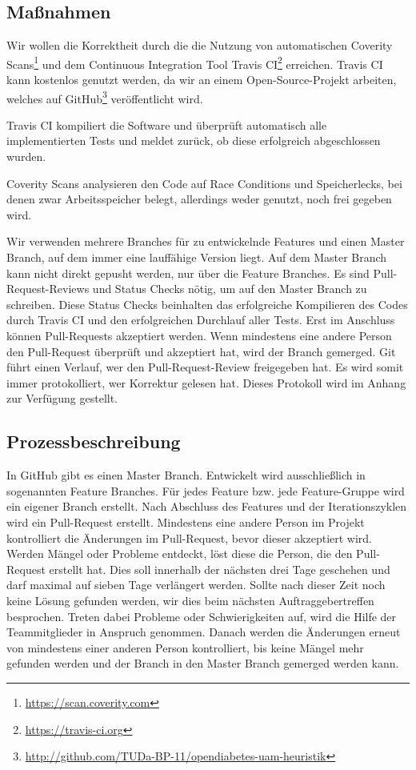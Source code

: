\documentclass[accentcolor=tud0b,12pt,paper=a4]{tudreport}
\begin{document}
	\subsection{Maßnahmen}
Wir wollen die Korrektheit durch die die Nutzung von automatischen Coverity Scans\footnote{\url{https://scan.coverity.com}} und dem Continuous Integration Tool Travis CI\footnote{\url{https://travis-ci.org}} erreichen. Travis CI kann kostenlos genutzt werden, da wir an einem Open-Source-Projekt arbeiten, welches auf GitHub\footnote{\url{http://github.com/TUDa-BP-11/opendiabetes-uam-heuristik}} veröffentlicht wird.

Travis CI kompiliert die Software und überprüft automatisch alle implementierten Tests und meldet zurück, ob diese erfolgreich abgeschlossen wurden. 

Coverity Scans analysieren den Code auf Race Conditions und Speicherlecks, bei denen zwar Arbeitsspeicher belegt, allerdings weder genutzt, noch frei gegeben wird. 

Wir verwenden mehrere Branches für zu entwickelnde Features und einen Master Branch, auf dem immer eine lauffähige Version liegt. Auf dem Master Branch kann nicht direkt gepusht werden, nur über die Feature Branches. Es sind Pull-Request-Reviews und Status Checks nötig, um auf den Master Branch zu schreiben. Diese Status Checks beinhalten das erfolgreiche Kompilieren des Codes durch Travis CI und den erfolgreichen Durchlauf aller Tests. Erst im Anschluss können Pull-Requests akzeptiert werden. Wenn mindestens eine andere Person den Pull-Request überprüft und akzeptiert hat, wird der Branch gemerged. Git führt einen Verlauf, wer den Pull-Request-Review freigegeben hat. Es wird somit immer protokolliert, wer Korrektur gelesen hat. Dieses Protokoll wird im Anhang zur Verfügung gestellt.


	\subsection{Prozessbeschreibung}
In GitHub gibt es einen Master Branch. Entwickelt wird ausschließlich in sogenannten Feature Branches. Für jedes Feature bzw. jede Feature-Gruppe wird ein eigener Branch erstellt. Nach Abschluss des Features und der Iterationszyklen wird ein Pull-Request erstellt. Mindestens eine andere Person im Projekt kontrolliert die Änderungen im Pull-Request, bevor dieser akzeptiert wird. Werden Mängel oder Probleme entdeckt, löst diese die Person, die den Pull-Request erstellt hat. Dies soll innerhalb der nächsten drei Tage geschehen und darf maximal auf sieben Tage verlängert werden. Sollte nach dieser Zeit noch keine Lösung gefunden werden, wir dies beim nächsten Auftraggebertreffen besprochen. Treten dabei Probleme oder Schwierigkeiten auf, wird die Hilfe der Teammitglieder in Anspruch genommen. Danach werden die Änderungen erneut von mindestens einer anderen Person kontrolliert, bis keine Mängel mehr gefunden werden und der Branch in den Master Branch gemerged werden kann. 
\end{document}
